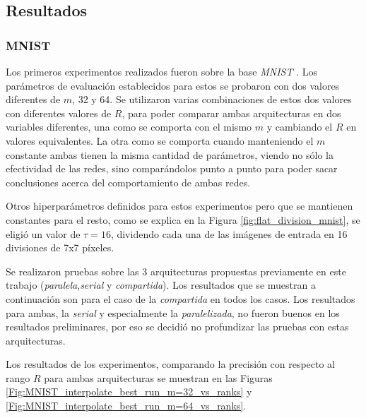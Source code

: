 \documentclass[spanish]{article}
\theoremstyle{definition}
\theoremstyle{remark}
\numberwithin{equation}{section}
\numberwithin{equation}{section} %
\begin{document}
\par




\subsection{Resultados}
\subsubsection{MNIST}
Los primeros experimentos realizados fueron sobre la base \textit{MNIST} \cite{lecun-mnisthandwrittendigit-2010}. Los parámetros de evaluación establecidos para estos se probaron con dos valores diferentes de $m$, 32 y 64. Se utilizaron varias combinaciones de estos dos valores con diferentes valores de $R$, para poder comparar ambas arquitecturas en dos variables diferentes, una como se comporta con el mismo $m$ y cambiando el $R$ en valores equivalentes. La otra como se comporta cuando manteniendo el $m$ constante ambas tienen la misma cantidad de parámetros, viendo no sólo la efectividad de las redes, sino comparándolos punto a punto para poder sacar conclusiones acerca del comportamiento de ambas redes. \par
Otros hiperparámetros definidos para estos experimentos pero que se mantienen constantes para el resto, como se explica en la Figura \ref{fig:flat_division_mnist}, se eligió un valor de $\tau = 16$, dividendo cada una de las imágenes de entrada en 16 divisiones de 7x7 píxeles. \par
Se realizaron pruebas sobre las 3 arquitecturas propuestas previamente en este trabajo (\textit{paralela},\textit{serial} y \textit{compartida}). Los resultados que se muestran a continuación son para el caso de la \textit{compartida} en todos los casos. Los resultados para ambas, la \textit{serial} y especialmente la \textit{paralelizada}, no fueron buenos en los resultados preliminares, por eso se decidió no profundizar las pruebas con estas arquitecturas.  
\par
Los resultados de los experimentos, comparando la precisión con respecto al rango $R$ para ambas arquitecturas se muestran en las Figuras \ref{Fig:MNIST_interpolate_best_run_m=32_vs_ranks} y \ref{Fig:MNIST_interpolate_best_run_m=64_vs_ranks}.
\end{document}
